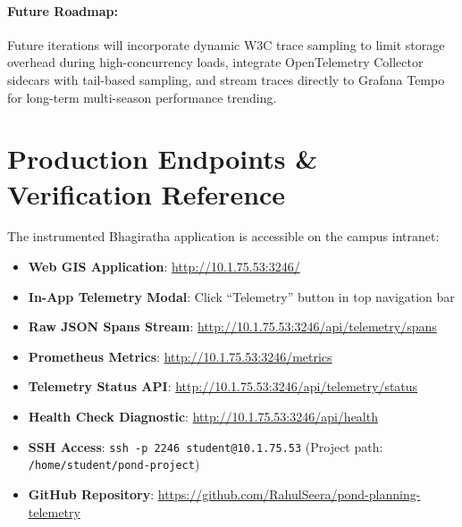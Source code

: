 \documentclass[11pt,a4paper]{article}
\begin{document}
\paragraph{Future Roadmap:} Future iterations will incorporate dynamic W3C trace sampling to limit storage overhead during high-concurrency loads, integrate OpenTelemetry Collector sidecars with tail-based sampling, and stream traces directly to Grafana Tempo for long-term multi-season performance trending.

\appendix
\section{Production Endpoints \& Verification Reference}
\label{sec:appendix}

The instrumented Bhagiratha application is accessible on the campus intranet:

\begin{tcolorbox}[colback=CardBg,colframe=NavyBlue,arc=3pt,boxrule=0.6pt,title={\sffamily\bfseries\small Operational Verification Endpoints (\texttt{10.1.75.53:3246})}]
\small
\begin{itemize}[leftmargin=*]
    \item \textbf{Web GIS Application}: \url{http://10.1.75.53:3246/}
    \item \textbf{In-App Telemetry Modal}: Click ``Telemetry'' button in top navigation bar
    \item \textbf{Raw JSON Spans Stream}: \url{http://10.1.75.53:3246/api/telemetry/spans}
    \item \textbf{Prometheus Metrics}: \url{http://10.1.75.53:3246/metrics}
    \item \textbf{Telemetry Status API}: \url{http://10.1.75.53:3246/api/telemetry/status}
    \item \textbf{Health Check Diagnostic}: \url{http://10.1.75.53:3246/api/health}
    \item \textbf{SSH Access}: \texttt{ssh -p 2246 student@10.1.75.53} (Project path: \texttt{/home/student/pond-project})
    \item \textbf{GitHub Repository}: \url{https://github.com/RahulSeera/pond-planning-telemetry}
\end{itemize}
\end{tcolorbox}
\end{document}
